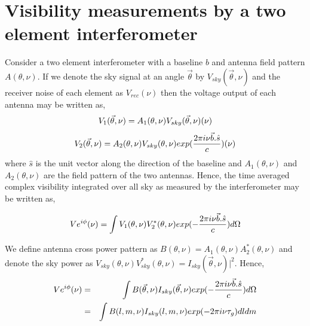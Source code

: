 \documentclass[12pt,preprint]{aastex}
\begin{document}
\section{Visibility measurements by a two element interferometer}
Consider a two element interferometer with a baseline $b$ and antenna field pattern $A(\theta, \nu)$. If we denote the sky signal at an angle $\vec \theta$ by $V_{sky}(\vec \theta, \nu)$ and the receiver noise of each element as $V_{rec}(\nu)$ then the voltage output of each antenna may be written as,  
\begin{equation}
V_{1}(\vec \theta, \nu) = A_{1}(\theta,\nu)V_{sky}(\vec \theta,\nu)(\nu)\nonumber\\
\end{equation}
\begin{equation}
V_{2} (\vec \theta, \nu)= A_{2}(\theta,\nu)V_{sky}(\theta,\nu)exp({2\pi i \nu \vec{b}.\hat{s} \over c} )(\nu)\nonumber\\
\end{equation}
where $\hat s$ is the unit vector along the direction of the baseline and $A_{1}(\theta,\nu)$ and $A_{2}(\theta,\nu)$ are the field pattern of the two antennas.
Hence, the time averaged complex visibility integrated over all sky as measured by the interferometer may be written as, 

\begin{equation}
V e^{i\phi}(\nu) =  \int  V_{1}(\theta,\nu)  V_{2}^{*} (\theta, \nu) exp(-{2\pi i \nu \vec{b}.\hat{s} \over c} ) d\Omega 
\label{eq1}
\end{equation}

We define antenna cross power pattern as  $B(\theta,\nu)=A_{1}(\theta,\nu)A_{2}^{*}(\theta,\nu)$ and denote the sky power as  $V_{sky}(\theta,\nu)V_{sky}^{*}(\theta,\nu) = I_{sky}(\vec \theta, \nu)|^2$. Hence, 
\begin{eqnarray}
V e^{i\phi}(\nu) & = & \int B(\vec \theta, \nu) I_{sky}(\vec \theta,\nu) exp(-{2\pi i \nu \vec{b}.\hat{s} \over c} ) d\Omega \nonumber\\
		& = & \int B(l,m, \nu) I_{sky}(l,m,\nu) exp(-2\pi i \nu \tau_{g} ) dl dm \nonumber\\
\label{eq2}
\end{eqnarray}
\end{document}
